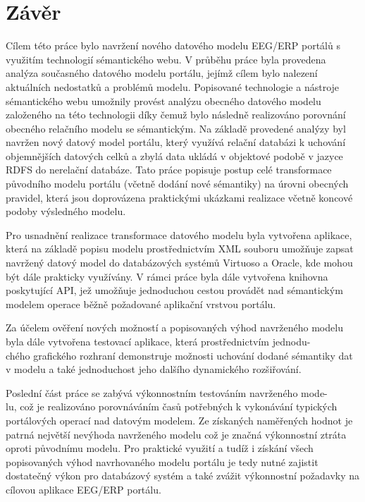 \documentclass{projekt}
\begin{document}
\chapter{Závěr}
\hspace{0.65cm}Cílem této práce bylo navržení nového datového modelu EEG/ERP portálů s využitím technologií sémantického webu. V průběhu práce byla provedena analýza současného datového modelu portálu, jejímž cílem bylo nalezení aktuálních nedostatků a problémů modelu. Popisované technologie a nástroje sémantického webu umožnily provést analýzu obecného datového modelu založeného na této technologii díky čemuž bylo následně realizováno porovnání obecného relačního modelu se sémantickým. Na základě provedené analýzy byl navržen nový datový model portálu, který využívá relační databázi k uchování objemnějších datových celků a zbylá data ukládá v objektové podobě v jazyce RDFS do nerelační databáze. Tato práce popisuje postup celé transformace původního modelu portálu (včetně dodání nové sémantiky) na úrovni obecných pravidel, která jsou doprovázena praktickými ukázkami realizace včetně koncové podoby výsledného modelu.

Pro usnadnění realizace transformace datového modelu byla vytvořena aplikace, která na základě popisu modelu prostřednictvím XML souboru umožňuje zapsat navržený datový model do databázových systémů Virtuoso a Oracle, kde mohou být dále prakticky využívány. 
V rámci práce byla dále vytvořena knihovna poskytující API, jež umožňuje jednoduchou cestou provádět nad sémantickým modelem operace běžně požadované aplikační vrstvou portálu.


Za účelem ověření nových možností a popisovaných výhod navrženého modelu byla dále vytvořena testovací aplikace, která prostřednictvím jednodu-\\chého grafického rozhraní demonstruje možnosti uchování dodané sémantiky dat v modelu a také jednoduchost jeho dalšího dynamického rozšiřování.

Poslední část práce se zabývá výkonnostním testováním navrženého mode-\\lu, což je realizováno porovnáváním časů potřebných k vykonávání typických portálových operací nad datovým modelem. Ze získaných naměřených hodnot je patrná největší nevýhoda navrženého modelu což je značná výkonnostní ztráta oproti původnímu modelu. Pro praktické využití a tudíž i získání všech popisovaných výhod navrhovaného modelu portálu je tedy nutné zajistit dostatečný výkon pro databázový systém a také zvážit výkonnostní požadavky na cílovou aplikace EEG/ERP portálu.
\end{document}
